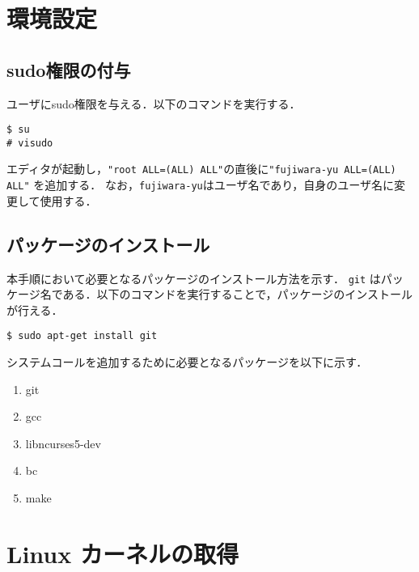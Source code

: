 \documentclass[12pt]{jsarticle}
\begin{document}
\section{環境設定}\label{sec:config}
\subsection{sudo権限の付与}
ユーザにsudo権限を与える．以下のコマンドを実行する．
\begin{verbatim}
$ su
# visudo
\end{verbatim}
エディタが起動し，\verb|"root ALL=(ALL) ALL"|の直後に\verb|"fujiwara-yu ALL=(ALL) ALL"| を追加する．
なお，\verb|fujiwara-yu|はユーザ名であり，自身のユーザ名に変更して使用する．

\subsection{パッケージのインストール}
本手順において必要となるパッケージのインストール方法を示す．
\verb|git| はパッケージ名である．以下のコマンドを実行することで，パッケージのインストールが行える．
\begin{verbatim}
$ sudo apt-get install git
\end{verbatim}
システムコールを追加するために必要となるパッケージを以下に示す．
\begin{enumerate}
\item git
\item gcc
\item libncurses5-dev
\item bc
\item make
\end{enumerate}

\section{Linux カーネルの取得}\label{sec:kernel}
\end{document}

